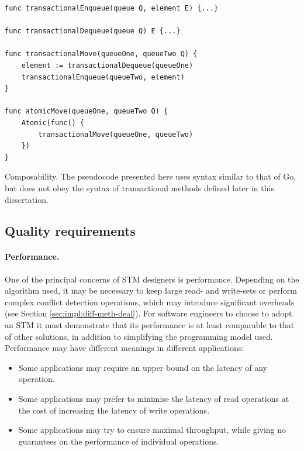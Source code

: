 \documentclass[12pt,a4paper,oneside,openright]{report}
\newcommand{\mycaption}[2]{\caption[#1]{#1 #2}}
\begin{document}
\begin{Listing}[hbtp]
\begin{lstlisting}
func transactionalEnqueue(queue Q, element E) {...}

func transactionalDequeue(queue Q) E {...}

func transactionalMove(queueOne, queueTwo Q) {
    element := transactionalDequeue(queueOne)
    transactionalEnqueue(queueTwo, element)
}

func atomicMove(queueOne, queueTwo Q) {
    Atomic(func() {
        transactionalMove(queueOne, queueTwo)
    })
}
\end{lstlisting}

  \mycaption{Composability.}{The pseudocode presented here uses syntax
    similar to that of Go, but does not obey the syntax of
    transactional methods defined later in this dissertation.}
  \label{lst:composability}
\end{Listing}


\subsection{Quality requirements}
\label{sec:prep:usab-requ}

\paragraph{Performance.} One of the principal concerns of STM
designers is performance. Depending on the algorithm used, it may be
necessary to keep large read- and write-sets or perform complex
conflict detection operations, which may introduce significant
overheads (see Section \ref{sec:impl:diff-meth-deal}). For software
engineers to choose to adopt an STM it must demonstrate that its
performance is at least comparable to that of other solutions, in
addition to simplifying the programming model used. Performance may
have different meanings in different applications:
\begin{itemize}
\item Some applications may require an upper bound on the latency of
  any operation.
\item Some applications may prefer to minimise the latency of read
  operations at the cost of increasing the latency of write
  operations.
\item Some applications may try to ensure maximal throughput, while
  giving no guarantees on the performance of individual operations.
\end{itemize}
\end{document}
